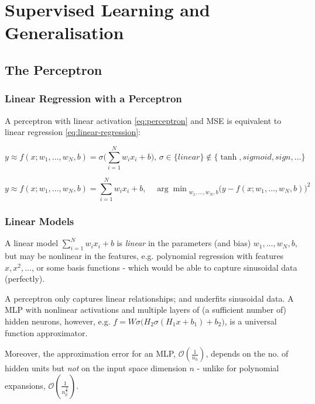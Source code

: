 \section{Supervised Learning and Generalisation}

\subsection{The Perceptron}

\subsubsection{Linear Regression with a Perceptron}

A perceptron with linear activation \eqref{eq:perceptron}
and MSE
is equivalent to linear regression \eqref{eq:linear-regression}:

\begin{equation}
    y \approx f(x; w_1, \dots, w_N, b) =  \sigma \big( \sum_{i=1}^N{w_i x_i} + b \big), \,
    \sigma \in \{ \textit{linear} \} \notin \{ \tanh, \textit{sigmoid}, \textit{sign}, \dots \}
    \label{eq:perceptron}
\end{equation}

\begin{equation}
    y \approx f(x; w_1, \dots, w_N, b) = \sum_{i=1}^N{w_i x_i} + b, \quad
    {\arg \min}_{w_1, \dots, w_N, b}{ \big( y - f(x; w_1, \dots, w_N, b) \big)^2 }
\label{eq:linear-regression}
\end{equation}

\subsubsection{Linear Models}

A linear model $\sum_{i=1}^N{w_i x_i} + b$ is \textit{linear} in the parameters \citep{deisenroth2020mathematicsforml}
(and bias) $w_1, \dots, w_N, b$, but may be nonlinear in the features,
e.g. polynomial regression with features $x, x^2, \dots$, or some basis functions -
which would be able to capture sinusoidal data (perfectly).

A perceptron only captures linear relationships; and underfits sinusoidal data.
A MLP
with nonlinear activations and
multiple layers of (a sufficient number of) hidden neurons, however,
e.g. $f = W \sigma\big(H_2 \sigma(H_1 x + b_1) + b_2\big)$,
is a universal function approximator. \citep{HORNIK1989359}

Moreover, the approximation error for an MLP, $\mathcal{O}(\frac{1}{n_h})$,
depends on the no. of hidden units but \textit{not} on the input space dimension $n$ -
unlike for polynomial expansions, $\mathcal{O}(\frac{1}{n_p^{\frac{2}{n}}})$.


